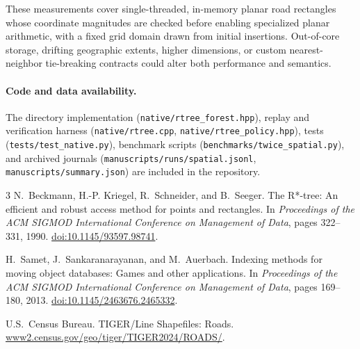\documentclass[10pt,letterpaper]{article}
\begin{document}
These measurements cover single-threaded, in-memory planar road rectangles whose coordinate magnitudes are checked before enabling specialized planar arithmetic, with a fixed grid domain drawn from initial insertions. Out-of-core storage, drifting geographic extents, higher dimensions, or custom nearest-neighbor tie-breaking contracts could alter both performance and semantics.

\paragraph{Code and data availability.}
The directory implementation (\nolinkurl{native/rtree_forest.hpp}), replay and verification harness (\nolinkurl{native/rtree.cpp}, \nolinkurl{native/rtree_policy.hpp}), tests (\nolinkurl{tests/test_native.py}), benchmark scripts (\nolinkurl{benchmarks/twice_spatial.py}), and archived journals (\nolinkurl{manuscripts/runs/spatial.jsonl}, \nolinkurl{manuscripts/summary.json}) are included in the repository.

\begin{thebibliography}{3}
N.~Beckmann, H.-P. Kriegel, R.~Schneider, and B.~Seeger.
\newblock The R*-tree: An efficient and robust access method for points and rectangles.
\newblock In \emph{Proceedings of the ACM SIGMOD International Conference on Management of Data}, pages 322--331, 1990.
\newblock \href{https://doi.org/10.1145/93597.98741}{doi:10.1145/93597.98741}.

H.~Samet, J.~Sankaranarayanan, and M.~Auerbach.
\newblock Indexing methods for moving object databases: Games and other applications.
\newblock In \emph{Proceedings of the ACM SIGMOD International Conference on Management of Data}, pages 169--180, 2013.
\newblock \href{https://doi.org/10.1145/2463676.2465332}{doi:10.1145/2463676.2465332}.

U.S.\ Census Bureau.
 TIGER/Line Shapefiles: Roads.
\newblock \href{https://www2.census.gov/geo/tiger/TIGER2024/ROADS/}{www2.census.gov/geo/tiger/TIGER2024/ROADS/}.
\end{thebibliography}
\end{document}

